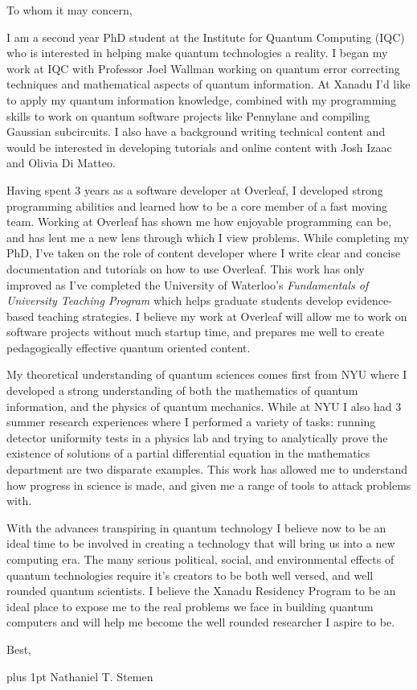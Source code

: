 \documentclass[12pt]{article}
\begin{document}
\noindent
To whom it may concern,

I am a second year PhD student at the Institute for Quantum Computing (IQC) who is interested in helping make quantum technologies a reality.
I began my work at IQC with Professor Joel Wallman working on quantum error correcting techniques and mathematical aspects of quantum information.
At Xanadu I'd like to apply my quantum information knowledge, combined with my programming skills to work on quantum software projects like Pennylane and compiling Gaussian subcircuits.
I also have a background writing technical content and would be interested in developing tutorials and online content with Josh Izaac and Olivia Di Matteo.

Having spent 3 years as a software developer at Overleaf, I developed strong programming abilities and learned how to be a core member of a fast moving team.
Working at Overleaf has shown me how enjoyable programming can be, and has lent me a new lens through which I view problems.
While completing my PhD, I've taken on the role of content developer where I write clear and concise documentation and tutorials on how to use Overleaf.
This work has only improved as I've completed the University of Waterloo's \emph{Fundamentals of University Teaching Program} which helps graduate students develop evidence-based teaching strategies.
I believe my work at Overleaf will allow me to work on software projects without much startup time, and prepares me well to create pedagogically effective quantum oriented content.

My theoretical understanding of quantum sciences comes first from NYU where I developed a strong understanding of both the mathematics of quantum information, and the physics of quantum mechanics.
While at NYU I also had 3 summer research experiences where I performed a variety of tasks: running detector uniformity tests in a physics lab and trying to analytically prove the existence of solutions of a partial differential equation in the mathematics department are two disparate examples.
This work has allowed me to understand how progress in science is made, and given me a range of tools to attack problems with.

With the advances transpiring in quantum technology I believe now to be an ideal time to be involved in creating a technology that will bring us into a new computing era.
The many serious political, social, and environmental effects of quantum technologies require it's creators to be both well versed, and well rounded quantum scientists.
I believe the Xanadu Residency Program to be an ideal place to expose me to the real problems we face in building quantum computers and will help me become the well rounded researcher I aspire to be.

\noindent
Best,

\parskip=0pt plus 1pt
Nathaniel T. Stemen
\end{document}

